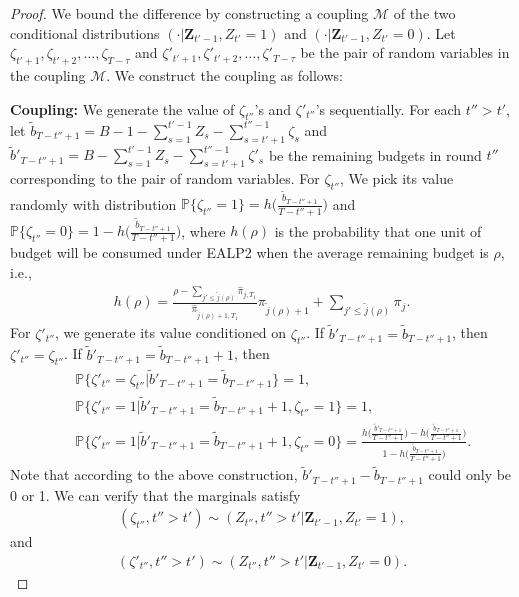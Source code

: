 \begin{proof}
We bound the difference by constructing a coupling $\mathcal{M}$ of the two conditional distributions $(\cdot|\boldsymbol{Z}_{t'-1}, Z_{t'} =1)$ and $(\cdot|\boldsymbol{Z}_{t'-1}, Z_{t'} =0)$. Let $\zeta_{t'+1}, \zeta_{t'+2}, \ldots, \zeta_{T-\tau}$ and $\zeta'_{t'+1}, \zeta'_{t'+2}, \ldots, \zeta'_{T-\tau}$ be the pair of random variables in the coupling $\mathcal{M}$. We construct the coupling as follows:

\textbf{Coupling:} We generate the value of $\zeta_{t''}$'s and $\zeta'_{t''}$'s sequentially. For each $t'' > t'$, let $\tilde{b}_{T-t''+1} = B - 1-\sum_{s = 1}^{t'-1}Z_{s} - \sum_{s = t'+1}^{t''-1}\zeta_{s}$ and $\tilde{b}'_{T-t''+1} = B -\sum_{s = 1}^{t'-1}Z_{s} - \sum_{s = t'+1}^{t''-1}\zeta'_{s}$ be the remaining budgets in round $t''$ corresponding to the pair of random variables. For $\zeta_{t''}$, We pick its value randomly with distribution $\mathbb{P}\{\zeta_{t''} = 1\} = h\big(\frac{\tilde{b}_{T-t''+1}}{T-t''+1}\big)$ and $\mathbb{P}\{\zeta_{t''} = 0\} = 1-h\big(\frac{\tilde{b}_{T-t''+1}}{T-t''+1}\big)$, where $h(\rho)$ is the probability that one unit of budget will be consumed under EALP2 when the average remaining budget is $\rho$, i.e.,
\begin{eqnarray} \label{eq:pull_prob_est}
h(\rho) = \frac{\rho - \sum_{j' \leq \tilde{j}(\rho)}\hat{\pi}_{j,T_1}}{\hat{\pi}_{\tilde{j}(\rho)+1, T_1}}\pi_{\tilde{j}(\rho)+1} + \sum_{j' \leq \tilde{j}(\rho)}\pi_j.
\end{eqnarray}
For $\zeta'_{t''}$, we generate its value conditioned on $\zeta_{t''}$. If $\tilde{b}'_{T-t''+1} = \tilde{b}_{T-t''+1}$, then $\zeta'_{t''} = \zeta_{t''}$. If $\tilde{b}'_{T-t''+1} = \tilde{b}_{T-t''+1} + 1$, then
\begin{eqnarray}
&&\mathbb{P}\big\{\zeta'_{t''} = \zeta_{t''}|\tilde{b}'_{T-t''+1} = \tilde{b}_{T-t''+1}\big\} = 1, \nonumber\\
&&\mathbb{P}\big\{\zeta'_{t''} = 1|\tilde{b}'_{T-t''+1} = \tilde{b}_{T-t''+1}+1, \zeta_{t''} = 1\big\} = 1, \nonumber \\
&&\mathbb{P}\big\{\zeta'_{t''} = 1|\tilde{b}'_{T-t''+1} = \tilde{b}_{T-t''+1}+1, \zeta_{t''} = 0\big\} = \frac{h\big(\frac{\tilde{b}'_{T-t''+1}}{T-t''+1}\big) - h\big(\frac{\tilde{b}_{T-t''+1}}{T-t''+1}\big)}{1- h\big(\frac{\tilde{b}_{T-t''+1}}{T-t''+1}\big)}.\nonumber
\end{eqnarray}
Note that according to the above construction, $\tilde{b}'_{T-t''+1}- \tilde{b}_{T-t''+1}$ could only be 0 or 1. We can verify that the marginals satisfy
\begin{eqnarray}
(\zeta_{t''}, t'' > t')\sim (Z_{t''}, t'' > t'|\boldsymbol{Z}_{t'-1}, Z_{t'} =1), \nonumber
\end{eqnarray}
and
\begin{eqnarray}
(\zeta'_{t''}, t'' > t')\sim (Z_{t''}, t'' > t'|\boldsymbol{Z}_{t'-1}, Z_{t'} =0). \nonumber
\end{eqnarray}


\end{proof}
